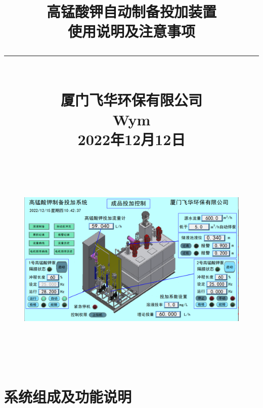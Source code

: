 \documentclass[UTF8,a4paper,12pt,titlepage]{ctexart}
\begin{document}
\title{
    高锰酸钾自动制备投加装置\\[2.5mm]
    使用说明及注意事项\\
   {\noindent}\rule{16cm}{1pt}\\[3mm]
    厦门飞华环保有限公司\\
    Wym\\
    2022年12月12日
   \begin{figure}[h]
      \centering
      \includegraphics[height=10cm]{g1.PNG}
   \end{figure}
}
\date{}

\maketitle %

\tableofcontents %

\newpage %

\section{系统组成及功能说明}
\end{document}
